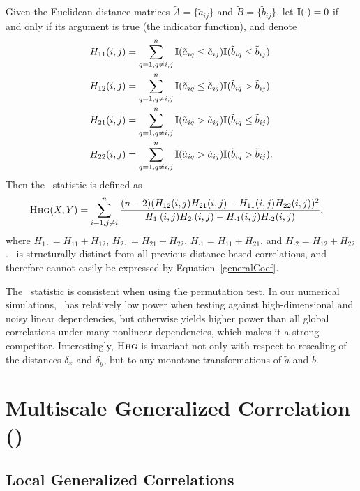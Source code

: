\documentclass[11pt]{article}
\begin{document}
Given the Euclidean distance matrices $\tilde{A}=\{\tilde{a}_{ij}\}$ and $\tilde{B}=\{\tilde{b}_{ij}\}$, let $\mathbb{I}(\cdot)=0$ if and only if its argument is true (the indicator function), and denote
\begin{align*}
H_{11}(i,j) &= \sum_{q=1,q\neq i,j}^{n}\mathbb{I}(\tilde{a}_{iq} \leq \tilde{a}_{ij})\mathbb{I}(\tilde{b}_{iq} \leq \tilde{b}_{ij}) \\
H_{12}(i,j) &= \sum_{q=1,q\neq i,j}^{n}\mathbb{I}(\tilde{a}_{iq} \leq \tilde{a}_{ij})\mathbb{I}(\tilde{b}_{iq} > \tilde{b}_{ij}) \\
H_{21}(i,j) &= \sum_{q=1,q\neq i,j}^{n}\mathbb{I}(\tilde{a}_{iq} > \tilde{a}_{ij})\mathbb{I}(\tilde{b}_{iq} \leq \tilde{b}_{ij}) \\
H_{22}(i,j) &= \sum_{q=1,q\neq i,j}^{n}\mathbb{I}(\tilde{a}_{iq} > \tilde{a}_{ij})\mathbb{I}(\tilde{b}_{iq} > \tilde{b}_{ij}).
\end{align*}
Then the \Hhg~statistic is defined as
\begin{align*}
{\normalfont\textsc{Hhg}}(X,Y) &= \sum_{i=1,j\neq i}^{n} \frac{(n-2)(H_{12}(i,j)H_{21}(i,j)-H_{11}(i,j)H_{22}(i,j))^2}{H_{1 \cdot}(i,j)H_{2 \cdot}(i,j)-H_{\cdot 1}(i,j)H_{\cdot 2}(i,j)},
\end{align*}
where $H_{1 \cdot}=H_{11}+H_{12}$, $H_{2 \cdot}=H_{21}+H_{22}$, $H_{\cdot 1}=H_{11}+H_{21}$, and $H_{\cdot 2}=H_{12}+H_{22}$. \Hhg~is structurally distinct from all previous distance-based correlations, and therefore cannot easily be expressed by Equation~\ref{generalCoef}.

The \Hhg~statistic is consistent when using the permutation test. In our numerical simulations, \Hhg~has relatively low power when testing against high-dimensional and noisy linear dependencies, but  otherwise yields higher power than all global correlations under many nonlinear dependencies, which makes it a strong competitor. 
Interestingly, ${\normalfont\textsc{Hhg}}$ is invariant not only with respect to rescaling of the distances $\delta_x$ and $\delta_y$, but to any monotone transformations of $\tilde{a}$ and $\tilde{b}$.

\section{Multiscale Generalized Correlation (\Mgc)}
\label{appen:mgc}

\subsection{Local Generalized Correlations}
\label{appen:localCorr}
\end{document}
